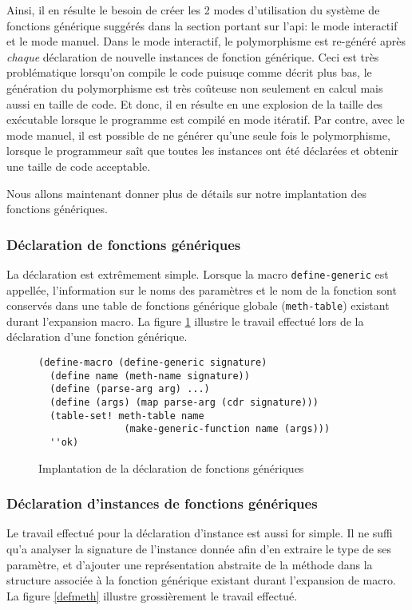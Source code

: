 \documentclass[letterpaper,12pt]{book}
\begin{document}
    Ainsi, il en résulte le besoin de créer les 2 modes d'utilisation
    du système de fonctions générique suggérés dans la section portant
    sur l'api: le mode interactif et le mode manuel. Dans le mode
    interactif, le polymorphisme est re-généré après \emph{chaque}
    déclaration de nouvelle instances de fonction générique. Ceci est
    très problématique lorsqu'on compile le code puisuqe comme décrit
    plus bas, le génération du polymorphisme est très coûteuse non
    seulement en calcul mais aussi en taille de code. Et donc, il en
    résulte en une explosion de la taille des exécutable lorsque le
    programme est compilé en mode itératif. Par contre, avec le mode
    manuel, il est possible de ne générer qu'une seule fois le
    polymorphisme, lorsque le programmeur saît que toutes les
    instances ont été déclarées et obtenir une taille de code
    acceptable.

    Nous allons maintenant donner plus de détails sur notre
    implantation des fonctions génériques.

    \subsubsection{Déclaration de fonctions génériques}
      La déclaration est extrêmement simple. Lorsque la macro
      \texttt{define-generic} est appellée, l'information sur le noms
      des paramètres et le nom de la fonction sont conservés dans une
      table de fonctions générique globale (\texttt{meth-table})
      existant durant l'expansion macro. La figure \ref{defgen}
      illustre le travail effectué lors de la déclaration d'une
      fonction générique.

      \begin{figure}[h!]
        \begin{lstlisting}
(define-macro (define-generic signature)
  (define name (meth-name signature))
  (define (parse-arg arg) ...)
  (define (args) (map parse-arg (cdr signature)))
  (table-set! meth-table name 
               (make-generic-function name (args)))
  ''ok)
        \end{lstlisting}
        \caption{Implantation de la déclaration de fonctions
          génériques}
        \label{defgen}
      \end{figure}
    
    \subsubsection{Déclaration d'instances de fonctions génériques}
      Le travail effectué pour la déclaration d'instance est aussi for
      simple. Il ne suffi qu'a analyser la signature de l'instance
      donnée afin d'en extraire le type de ses paramètre, et d'ajouter
      une représentation abstraite de la méthode dans la structure
      associée à la fonction générique existant durant l'expansion de
      macro. La figure \ref{defmeth} illustre grossièrement le travail
      effectué.
\end{document}
